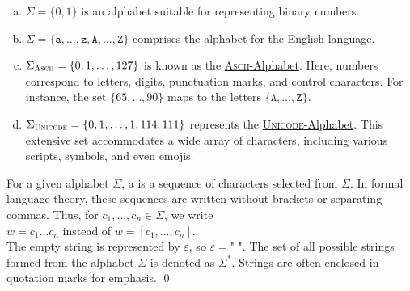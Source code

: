 \examplesEng
\begin{enumerate}[(a)]
\item \( \Sigma = \{ 0, 1 \} \) is an alphabet suitable for representing binary numbers.
\item \( \Sigma = \{ \mathtt{a}, \ldots, \mathtt{z}, \mathtt{A}, \ldots, \mathtt{Z} \} \) comprises the alphabet for the English language.
\item \( \Sigma_{\textsc{\scriptsize Ascii}} = \{ 0, 1, \ldots, 127 \} \) is known as the
      \href{http://en.wikipedia.org/wiki/ASCII}{\textsc{Ascii}-Alphabet}.  Here,
      numbers correspond to letters, digits, punctuation marks, and control characters. For instance, the set
      \( \{ 65, \ldots, 90 \} \) maps to the letters \( \{ \mathtt{A}, \ldots, \mathtt{Z} \} \).
\item \( \Sigma_{\textsc{\scriptsize Unicode}} = \{ 0, 1, \ldots, 1,114,111 \} \) represents the
      \href{https://en.wikipedia.org/wiki/Unicode}{\textsc{Unicode}-Alphabet}. 
      This extensive set accommodates a wide array of characters, including various scripts, symbols, and even emojis. 
\eox
\end{enumerate}

\begin{Definition}[Strings]
For a given alphabet \( \Sigma \), a   is a sequence of characters selected from \( \Sigma \). In formal language theory, these sequences are written without brackets or separating commas. Thus, for \( c_1, \ldots, c_n \in \Sigma \), we write
\\[0.2cm]
\hspace*{1.3cm}
\( w = c_1 \ldots c_n \) \quad instead of \quad \( w = [c_1, \ldots, c_n] \).
\\[0.2cm]
The empty string is represented by \( \varepsilon \), \index{\( \varepsilon \)} so \( \varepsilon = \texttt{" "} \).
The set of all possible strings formed from the alphabet \( \Sigma \) is denoted as \( \Sigma^* \). \index{\( \Sigma^* \)} Strings are often enclosed in quotation marks for emphasis.
\qed
\end{Definition}

